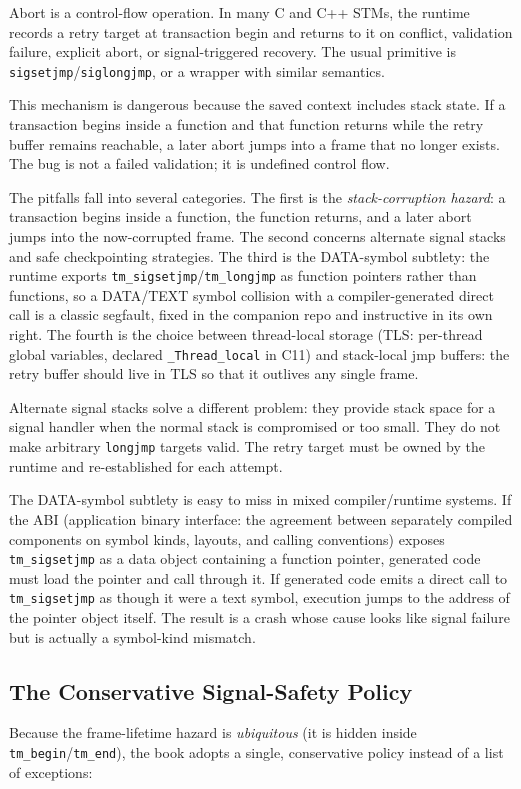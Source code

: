 Abort is a control-flow operation.  In many C and C++ STMs, the runtime records a retry target at transaction begin and returns to it on conflict, validation failure, explicit abort, or signal-triggered recovery.  The usual primitive is \texttt{sigsetjmp}/\texttt{siglongjmp}, or a wrapper with similar semantics.

This mechanism is dangerous because the saved context includes stack state.  If a transaction begins inside a function and that function returns while the retry buffer remains reachable, a later abort jumps into a frame that no longer exists.  The bug is not a failed validation; it is undefined control flow.

The pitfalls fall into several categories. The first is the \emph{stack-corruption hazard}: a transaction begins inside a function, the function returns, and a later abort jumps into the now-corrupted frame. The second concerns alternate signal stacks and safe checkpointing strategies. The third is the DATA-symbol subtlety: the runtime exports \texttt{tm\_sigsetjmp}\slash{}\texttt{tm\_longjmp} as function pointers rather than functions, so a DATA/TEXT symbol collision with a compiler-generated direct call is a classic segfault, fixed in the companion repo and instructive in its own right. The fourth is the choice between thread-local storage (TLS: per-thread global variables, declared \texttt{\_Thread\_local} in C11) and stack-local jmp buffers: the retry buffer should live in TLS so that it outlives any single frame.

Alternate signal stacks solve a different problem: they provide stack space for a signal handler when the normal stack is compromised or too small.  They do not make arbitrary \texttt{longjmp} targets valid.  The retry target must be owned by the runtime and re-established for each attempt.

The DATA-symbol subtlety is easy to miss in mixed compiler/runtime systems.  If the ABI (application binary interface: the agreement between separately compiled components on symbol kinds, layouts, and calling conventions) exposes \texttt{tm\_sigsetjmp} as a data object containing a function pointer, generated code must load the pointer and call through it.  If generated code emits a direct call to \texttt{tm\_sigsetjmp} as though it were a text symbol, execution jumps to the address of the pointer object itself.  The result is a crash whose cause looks like signal failure but is actually a symbol-kind mismatch.

\subsection{The Conservative Signal-Safety Policy}
Because the frame-lifetime hazard is \emph{ubiquitous} (it is hidden inside
\texttt{tm\_begin}/\texttt{tm\_end}), the book adopts a single, conservative
policy instead of a list of exceptions:


